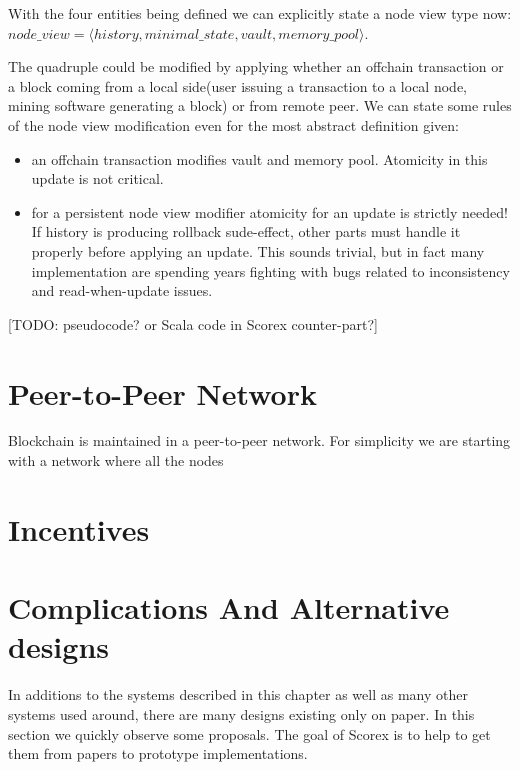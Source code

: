 \documentclass[]{report}   %
\begin{document}
With the four entities being defined we can explicitly state a node view type now: \(node\_view = \langle history, minimal\_state, vault, memory\_pool \rangle \).

The quadruple could be modified by applying whether an offchain transaction or a block coming from a local side(user issuing a transaction to a local node, mining software generating a block) or from remote peer. We can state some rules of the node view  modification even for the most abstract definition given:

\begin{itemize}
\item an offchain transaction modifies vault and memory pool. Atomicity in this update is not critical.

\item for a persistent node view modifier atomicity for an update is strictly needed! If history is producing rollback sude-effect, other parts must handle it properly before applying an update. This sounds trivial, but in fact many implementation are spending years fighting with bugs related to inconsistency and read-when-update issues.
\end{itemize}


[TODO: pseudocode? or Scala code in Scorex counter-part?]


\section{Peer-to-Peer Network}	

Blockchain is maintained in a peer-to-peer network. For simplicity we are starting with a network where all the nodes 

\section{Incentives}



\section{Complications And Alternative designs}

In additions to the systems described in this chapter as well as many other systems used around, there are many designs existing only on paper. In this section we quickly observe some proposals. The goal of Scorex is to help to get them from papers to prototype implementations. 
\end{document}
